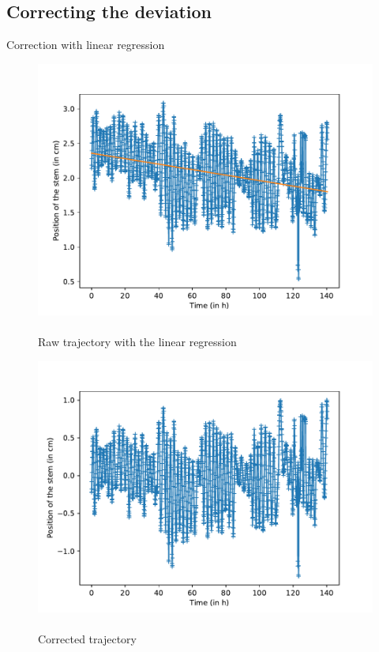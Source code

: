\documentclass[12pt]{beamer}
\begin{document}
\subsection{Correcting the deviation}
\begin{frame}{Correction with linear regression}
\begin{multicols}{2}
\begin{figure}
\includegraphics[width = \linewidth]{trajScaledRaw.pdf}~\\
Raw trajectory with the linear regression
\end{figure}
\begin{figure}
\includegraphics[width = \linewidth]{trajScaledCorr.pdf}~\\
Corrected trajectory
\end{figure}
\end{multicols}
\end{frame}
\end{document}
